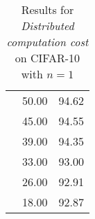 \begin{table}[h]
\begin{tabular}{|c||cc|}
                            & 50.00                       & 94.62        \\
                            & 45.00                       & 94.55        \\
                            & 39.00                       & 94.35        \\
                            & 33.00                       & 93.00        \\
                            & 26.00                       & 92.91        \\
                            & 18.00                       & 92.87        \\ \hline
\end{tabular}
\caption{Results for \textit{Distributed computation cost} on CIFAR-10 with $n=1$}
\label{cif10_para1}
\end{table}